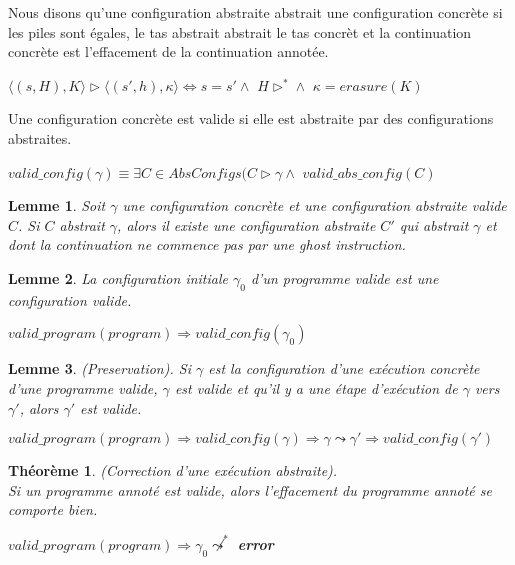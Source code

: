 \documentclass[11pt,openany]{article}
\newtheorem{lemme}{Lemme}
\newtheorem{theorem}{Th\'eor\`eme}
\begin{document}
		Nous disons qu'une configuration abstraite abstrait une configuration concr\`ete si les piles sont \'egales, le tas abstrait abstrait le tas concr\`et et la continuation concr\`ete est l'effacement de la continuation annot\'ee.
		\begin{center}
		$\langle (s,H),K\rangle\rhd\langle(s',h),\kappa\rangle\Leftrightarrow s=s'\land$ $H\rhd^*\land$ $\kappa = erasure(K)$
		\end{center}
		Une configuration concr\`ete est valide si elle est abstraite par des configurations abstraites.
		\begin{center}
		$valid\_config(\gamma)\equiv\exists C\in AbsConfigs (C\rhd\gamma\land$ $valid\_abs\_config(C)$
		\end{center}
		\begin{lemme}
			Soit $\gamma$ une configuration concr\`ete et une configuration abstraite valide $C$. Si $C$ abstrait $\gamma$, alors il existe une configuration abstraite $C'$ qui abstrait $\gamma$ et dont la continuation ne commence pas par une ghost instruction.
		\end{lemme}
		\begin{lemme}
			La configuration initiale $\gamma_0$ d'un programme valide est une configuration valide.
			\begin{center}
			$valid\_program(program)\Rightarrow valid\_config(\gamma_0)$
			\end{center}
		\end{lemme}
		\begin{lemme}
			(Preservation). Si $\gamma$ est la configuration d'une ex\'ecution concr\`ete d'une programme valide, $\gamma$ est valide et qu'il y a une \'etape d'ex\'ecution de $\gamma$ vers $\gamma '$, alors $\gamma '$ est valide.
			\begin{center}
			$valid\_program(program)\Rightarrow valid\_config(\gamma)\Rightarrow \gamma\leadsto\gamma '\Rightarrow valid\_config(\gamma ')$
			\end{center}
		\end{lemme}
	
		\begin{theorem}
			(Correction d'une ex\'ecution abstraite).\\
			Si un programme annot\'e est valide, alors l'effacement du programme annot\'e se comporte bien.
			\begin{center}
			$valid\_program(program)\Rightarrow\gamma_0 \not\leadsto^*$ \textbf{error}
			\end{center}
		\end{theorem}
\end{document}
